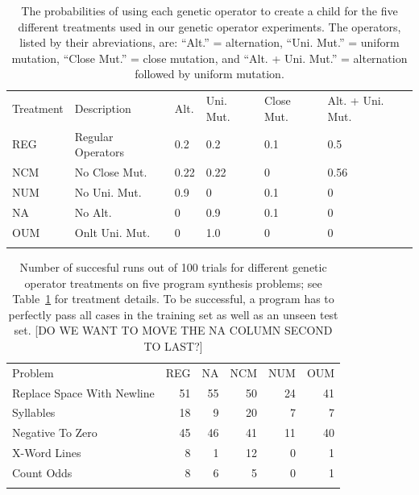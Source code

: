 \documentclass[graybox]{svmult}
\begin{document}
\begin{table}[t]
\centering
\caption{The probabilities of using each genetic operator to create a child for the five different treatments used in our genetic operator experiments. The operators, listed by their abreviations, are:
``Alt.'' = alternation,
``Uni. Mut.'' = uniform mutation,
``Close Mut.'' = close mutation, and
``Alt. + Uni. Mut.'' = alternation followed by uniform mutation.}
\label{genetic-operator-combinations}
\begin{tabular}{ll llll}
\hline\noalign{\smallskip}
Treatment & Description & Alt. & Uni. Mut. & Close Mut. & Alt. + Uni. Mut. \\
\noalign{\smallskip}\svhline\noalign{\smallskip}
REG & Regular Operators &  0.2 &  0.2 &  0.1 &  0.5  \\
NCM & No Close Mut.  &  0.22 &  0.22 &  0 &  0.56  \\
NUM & No Uni. Mut. &  0.9 &  0 &  0.1 &  0  \\
NA  & No Alt. &  0 &  0.9 &  0.1 &  0  \\
OUM & Onlt Uni. Mut. &  0 &  1.0 &  0 &  0  \\
\noalign{\smallskip}\hline\noalign{\smallskip}
\end{tabular}
\end{table}

\begin{table}[t]
\centering
\label{genetic-operator-results}
\caption{Number of succesful runs out of 100 trials for different genetic operator treatments on five program synthesis problems; see Table~\ref{genetic-operator-combinations} for treatment details. To be successful, a program has to perfectly pass all cases in the training set as well as an unseen test set. [DO WE WANT TO MOVE THE NA COLUMN SECOND TO LAST?]}
\begin{tabular}{l r r r r r}
\hline\noalign{\smallskip}
Problem                    & REG & NA & NCM & NUM & OUM \\
\noalign{\smallskip}\svhline\noalign{\smallskip}
Replace Space With Newline &  51 & 55 &  50 &  24 &  41 \\
Syllables                  &  18 &  9 &  20 &   7 &   7 \\
Negative To Zero           &  45 & 46 &  41 &  11 &  40 \\
X-Word Lines               &   8 &  1 &  12 &   0 &   1 \\
Count Odds                 &   8 &  6 &   5 &   0 &   1 \\
\noalign{\smallskip}\hline\noalign{\smallskip}
\end{tabular}
\end{table}
\end{document}
